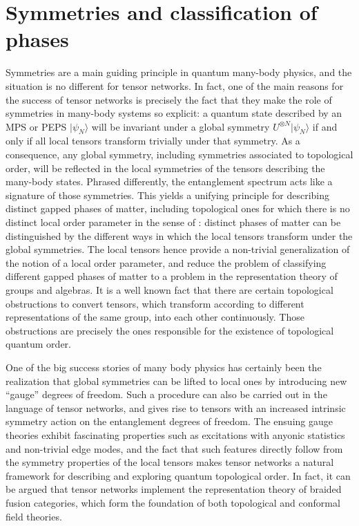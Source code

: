 \documentclass[rmp,aps,reprint,superscriptaddress,nobalancelastpage]{revtex4-1}
\begin{document}
\section{Symmetries and classification of phases \label{sec:3}}


Symmetries are a main guiding principle in quantum many-body physics, and the situation is no different for tensor networks. In fact, one of the main reasons for the success of tensor networks is precisely the fact that they make the role of symmetries in many-body systems so explicit: a quantum state described by an MPS or PEPS $|\psi_N\rangle$  will be invariant under a global symmetry $U^{\otimes N}|\psi_N\rangle$ if and only if all local tensors transform trivially under that symmetry. As a consequence, any global symmetry, including symmetries associated to topological order, will be reflected in the local symmetries of the tensors describing the many-body states. Phrased differently,  the entanglement spectrum acts like a signature of those symmetries. This yields a unifying principle for describing distinct gapped phases of matter, including topological ones for which there is no distinct local order parameter in the sense of \citet{landau1937theory}: distinct phases of matter can be distinguished by the different ways in which the local tensors transform under the global symmetries. The local tensors hence provide a non-trivial generalization of the notion of a local order parameter, and reduce the problem of classifying different gapped phases of matter to a problem in the representation theory of groups and algebras. It is a well known fact that there are certain topological obstructions to convert tensors, which transform according to different representations of the same group, into each other continuously. Those obstructions are precisely the ones responsible for the existence of topological quantum order.

One of the big success stories of many body physics has certainly been the realization that global symmetries can be lifted to local ones by introducing new ``gauge'' degrees of freedom. Such a procedure can also be carried out in the language of tensor networks, and gives rise to tensors with an increased intrinsic symmetry action on the entanglement degrees of freedom. The ensuing gauge theories exhibit fascinating properties such as excitations with anyonic statistics and non-trivial edge modes, and the fact that such features directly follow from the symmetry properties of the local tensors makes tensor networks a natural framework for describing and exploring quantum topological order. In fact, it can be argued that tensor networks implement the representation theory of braided fusion categories, which form the foundation of both topological and conformal field theories.
\end{document}
